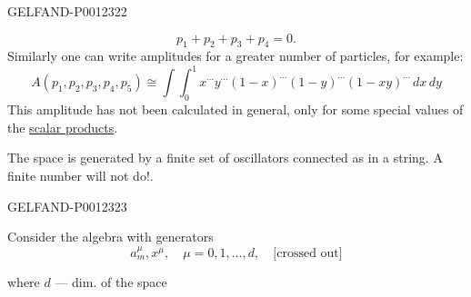 \begin{GelfandAdjacentEvidence}{GELFAND-P001232}{2}

\begin{equation*}
p_1+p_2+p_3+p_4=0.
\end{equation*}
Similarly one can write amplitudes for a greater number of particles,
for example:
\begin{equation*}
A(p_1,p_2,p_3,p_4,p_5)\cong\int\int_0^1
x^{\cdots}y^{\cdots}(1-x)^{\cdots}(1-y)^{\cdots}(1-xy)^{\cdots}\,dx\,dy\tag{12}
\end{equation*}
This amplitude has not been calculated in general, only for some special values of the \underline{scalar products}.

The space is generated by a finite set of oscillators connected as in a string. A finite number will not do!.
\end{GelfandAdjacentEvidence}
\begin{GelfandAdjacentEvidence}{GELFAND-P001232}{3}


Consider the algebra with generators
\begin{equation*}
a_m^\mu,x^\mu,\quad \mu=0,1,\ldots,d,\quad
\text{[crossed out]}\tag{13}
\end{equation*}
\end{GelfandAdjacentEvidence}

where \(d\) --- dim. of the space


